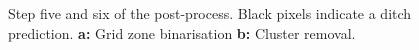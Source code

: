 \documentclass[]{interact}
\theoremstyle{plain}%
\theoremstyle{definition}
\theoremstyle{remark}
\begin{document}
\begin{figure} [!htb]
    \centering
    \hspace{5pt}
    \caption{Step five and six of the post-process. Black pixels indicate a ditch prediction. \textbf{a: }Grid zone binarisation \textbf{b: }Cluster removal.}
    \label{fig:postprocessing3}
\end{figure}
\end{document}
